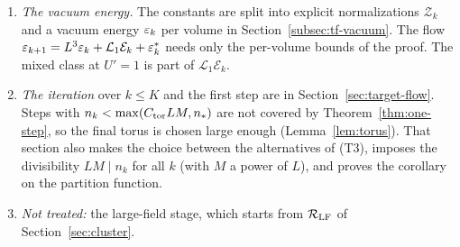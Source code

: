 \begin{remark}\label{rem:flow-remains}
\begin{enumerate}[label=(\alph*)]
\item \emph{The vacuum energy.} The constants are split into explicit normalizations $\mathcal Z_k$ and a vacuum energy $\varepsilon_k$ per volume in Section~\ref{subsec:tf-vacuum}. The flow $\varepsilon_{k+1}=L^3\varepsilon_k+\mathcal L_1\mathcal E_k+\varepsilon^*_k$ needs only the per-volume bounds of the proof. The mixed class at $U'=1$ is part of $\mathcal L_1\mathcal E_k$.
\item \emph{The iteration} over $k\le K$ and the first step are in Section~\ref{sec:target-flow}. Steps with $n_k<\max(C_{\rm tor}LM,n_*)$ are not covered by Theorem~\ref{thm:one-step}, so the final torus is chosen large enough (Lemma~\ref{lem:torus}). That section also makes the choice between the alternatives of (T3), imposes the divisibility $LM\mid n_k$ for all $k$ (with $M$ a power of $L$), and proves the corollary on the partition function.
\item \emph{Not treated:} the large-field stage, which starts from $\mathcal R_{\rm LF}$ of Section~\ref{sec:cluster}.
\end{enumerate}
\end{remark}
